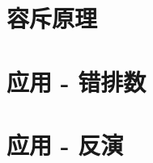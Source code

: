 \section{容斥原理}
\label{incexc:sec:incexc}



\section{应用 - 错排数}
\label{incexc:sec:derangement}

\questions


\section{应用 - 反演}
\label{incexc:sec:inverse}

